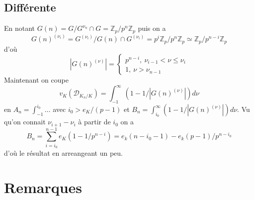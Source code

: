 \documentclass[a4paper,12pt]{book}
\newcommand{\Z}{\mathbb{Z}}
\newcommand{\D}{\mathscr{D}}
\theoremstyle{plain}
\theoremstyle{definition}
\theoremstyle{remark}
\begin{document}
\subsection{Différente}
En notant $G(n)=G/G^{\nu_n}\cap G=\Z_p/p^n\Z_p$ puis on a 
\[G(n)^{(\nu_i)}=G^{(\nu_i)}/G(n)\cap G^{(\nu_i)}=p^i\Z_p/p^n\Z_p\simeq \Z_p/p^{n-i}\Z_p\]
d'où \[|G(n)^{(\nu)}|=\begin{cases} p^{n-i},~\nu_{i-1}<\nu\leq \nu_i\\ 1,~\nu>\nu_{n-1}\end{cases}\]
Maintenant on coupe 
\[v_K(\D_{K_n/K})=\int_{-1}^\infty\left(1-1/|G(n)^{(\nu)}|\right)d\nu\]
en $A_n=\int_{-1}^{i_0}\ldots$ avec $i_0>e_K/(p-1)$ et
$B_n=\int_{i_0}^\infty \left(1-1/|G(n)^{(\nu)}|\right)d\nu$.
Vu qu'on connait $\nu_{i+1}-\nu_i$ à partir de $i_0$ on a
\[B_n=\sum_{i=i_0}^{n-1} e_K(1-1/p^{n-i})=e_k(n-i_0-1)-e_k(p-1)/p^{n-i_0}\]
d'où le résultat en arreangeant un peu.




\section{Remarques}
\end{document}
